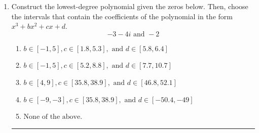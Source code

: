 \documentclass[14pt]{extbook}
\newcommand{\litem}[1]{\item#1\hspace*{-1cm}\rule{\textwidth}{0.4pt}}
\begin{document}
\begin{enumerate}
{\begin{enumerate}[label=\Alph*.]
\end{enumerate} }
\litem{
Construct the lowest-degree polynomial given the zeros below. Then, choose the intervals that contain the coefficients of the polynomial in the form $x^3+bx^2+cx+d$.\[ -3 - 4 i \text{ and } -2 \]\begin{enumerate}[label=\Alph*.]
\item \( b \in [-1, 5], c \in [1.8, 5.3], \text{ and } d \in [5.8, 6.4] \)
\item \( b \in [-1, 5], c \in [5.2, 8.8], \text{ and } d \in [7.7, 10.7] \)
\item \( b \in [4, 9], c \in [35.8, 38.9], \text{ and } d \in [46.8, 52.1] \)
\item \( b \in [-9, -3], c \in [35.8, 38.9], \text{ and } d \in [-50.4, -49] \)
\item \( \text{None of the above.} \)


\end{enumerate}}
\end{enumerate}
\end{document}
